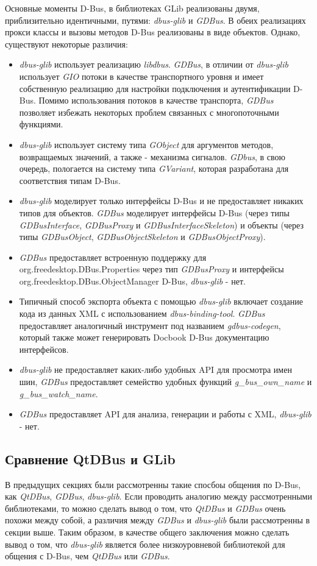 Основные моменты D-Bus, в библиотеках GLib реализованы двумя, приблизительно идентичными, путями: \textit{dbus-glib} и \textit{GDBus}. В обеих реализациях прокси классы и вызовы методов D-Bus реализованы в виде объектов. Однако, существуют некоторые различия:
\begin{itemize}
\item \textit{dbus-glib} использует реализацию \textit{libdbus}. \textit{GDBus}, в отличии от \textit{dbus-glib} использует \textit{GIO} потоки в качестве транспортного уровня и имеет собственную реализацию для настройки подключения и аутентификации D-Bus. Помимо использования потоков в качестве транспорта, \textit{GDBus} позволяет избежать некоторых проблем связанных с многопоточными функциями.
\item \textit{dbus-glib} использует систему типа \textit{GObject} для аргументов методов, возвращаемых значений, а также - механизма сигналов. \textit{GDbus}, в свою очередь, пологается на систему типа \textit{GVariant}, которая разработана для соответствия типам D-Bus. 
\item \textit{dbus-glib} моделирует только интерфейсы D-Bus и не предоставляет никаких типов для объектов. \textit{GDBus} моделирует интерфейсы D-Bus (через типы \textit{GDBusInterface}, \textit{GDBusProxy} и \textit{GDBusInterfaceSkeleton}) и объекты (через типы \textit{GDBusObject}, \textit{GDBusObjectSkeleton} и \textit{GDBusObjectProxy}).
\item \textit{GDBus} предоставляет встроенную поддержку для org.freedesktop.DBus.Properties через тип \textit{GDBusProxy} и интерфейсы org.freedesktop.DBus.ObjectManager D-Bus, \textit{dbus-glib} - нет.
\item Типичный способ экспорта объекта с помощью \textit{dbus-glib} включает создание кода из данных XML с использованием \textit{dbus-binding-tool}. \textit{GDBus} предоставляет аналогичный инструмент под названием \textit{gdbus-codegen}, который также может генерировать Docbook D-Bus документацию интерфейсов.
\item \textit{dbus-glib} не предоставляет каких-либо удобных API для просмотра имен шин, \textit{GDBus} предоставляет семейство удобных функций \textit{g\_bus\_own\_name} и \textit{g\_bus\_watch\_name}.
\item \textit{GDBus} предоставляет API для анализа, генерации и работы с XML, \textit{dbus-glib} - нет.~\cite{freedesktop}
\end{itemize}

\subsection{Сравнение QtDBus и GLib}
В предыдущих секциях были рассмотренны такие спосбоы общения по D-Bus, как \textit{QtDBus}, \textit{GDBus}, \textit{dbus-glib}. Если проводить аналогию между рассмотренными библиотеками, то можно сделать вывод о том, что \textit{QtDBus} и \textit{GDBus} очень похожи между собой, а различия между \textit{GDBus} и \textit{dbus-glib} были рассмотренны в секции выше. Таким образом, в качестве общего заключения можно сделать вывод о том, что \textit{dbus-glib} является более низкоуровневой библиотекой для общения с D-Bus, чем \textit{QtDBus} или \textit{GDBus}.
